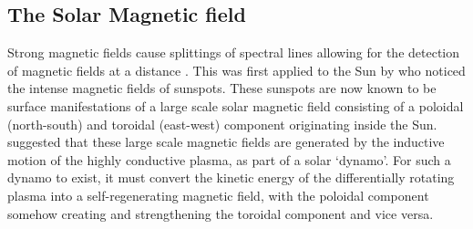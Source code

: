 \documentclass[11pt,a4paper,onecolumn]{report}
\begin{document}
\subsection{The Solar Magnetic field}
%
\label{sec:dynamo}
Strong magnetic fields cause splittings of
spectral lines allowing for the detection of magnetic fields at a distance
\citep{zeeman_over_1896}. This was first applied to the Sun by
\citet{hale_probable_1908} who noticed the intense magnetic fields of sunspots.
These sunspots are now known to be surface manifestations of a large scale solar
magnetic field consisting of a poloidal (north-south) and toroidal (east-west)
component originating inside the Sun. \citet{JosephLarmor1919} suggested that
these large scale magnetic fields are generated by the inductive motion of the
highly conductive plasma, as part of a solar `dynamo'. For such a dynamo to
exist, it must convert the kinetic energy of the differentially rotating plasma
into a self-regenerating magnetic field, with the poloidal component somehow
creating and strengthening the toroidal component and vice versa. \\
\end{document}
